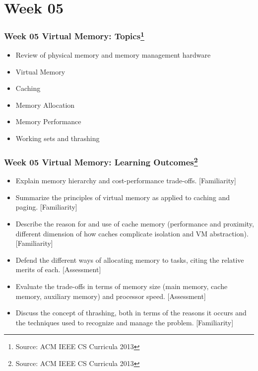 
\section{Week 05}
\begin{frame}[fragile]
\frametitle{Week 05 Virtual Memory:
Topics\footnote{Source: ACM IEEE CS Curricula 2013}}

\begin{itemize}
\item Review of physical memory and memory management hardware 
\item Virtual Memory 
\item Caching 
\item Memory Allocation 
\item Memory Performance 
\item Working sets and thrashing 
\end{itemize}
\end{frame}

\begin{frame}[fragile]
\frametitle{Week 05 Virtual Memory:
Learning Outcomes\footnote{Source: ACM IEEE CS Curricula 2013}}
\begin{itemize}
\item Explain memory hierarchy and cost-performance trade-offs. [Familiarity]
\item Summarize the principles of virtual memory as applied to caching and paging. [Familiarity] 
\item Describe the reason for and use of cache memory (performance and proximity, different dimension of how caches complicate isolation and VM abstraction). [Familiarity] 
\item Defend the different ways of allocating memory to tasks, citing the relative merits of each. [Assessment] 
\item Evaluate the trade-offs in terms of memory size (main memory, cache memory, auxiliary memory) and processor speed. [Assessment] 
\item Discuss the concept of thrashing, both in terms of the reasons it occurs and the techniques used to recognize and manage the problem. [Familiarity] 
\end{itemize}

\end{frame}

